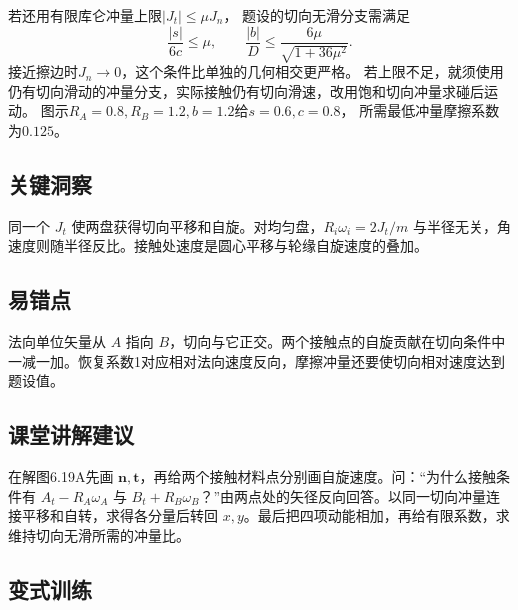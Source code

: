 \documentclass[UTF8,fontset=fandol,a4paper,11pt]{ctexart}
\begin{document}
若还用有限库仑冲量上限$|J_t|\leq\mu J_n$，
题设的切向无滑分支需满足
\[
\frac{|s|}{6c}\leq\mu,
\qquad \frac{|b|}{D}\leq\frac{6\mu}{\sqrt{1+36\mu^2}}.
\]
接近擦边时$J_n\to0$，这个条件比单独的几何相交更严格。
若上限不足，就须使用仍有切向滑动的冲量分支，实际接触仍有切向滑速，改用饱和切向冲量求碰后运动。
图示$R_A=0.8,R_B=1.2,b=1.2$给$s=0.6,c=0.8$，
所需最低冲量摩擦系数为$0.125$。




\subsection*{关键洞察}

同一个 $J_t$ 使两盘获得切向平移和自旋。对均匀盘，$R_i\omega_i=2J_t/m$ 与半径无关，角速度则随半径反比。接触处速度是圆心平移与轮缘自旋速度的叠加。



\subsection*{易错点}

法向单位矢量从 $A$ 指向 $B$，切向与它正交。两个接触点的自旋贡献在切向条件中一减一加。恢复系数1对应相对法向速度反向，摩擦冲量还要使切向相对速度达到题设值。



\subsection*{课堂讲解建议}

在解图6.19A先画 $\boldsymbol n,\boldsymbol t$，再给两个接触材料点分别画自旋速度。问：“为什么接触条件有 $A_t-R_A\omega_A$ 与 $B_t+R_B\omega_B$？”由两点处的矢径反向回答。以同一切向冲量连接平移和自转，求得各分量后转回 $x,y$。最后把四项动能相加，再给有限系数，求维持切向无滑所需的冲量比。




\subsection*{变式训练}
\end{document}
